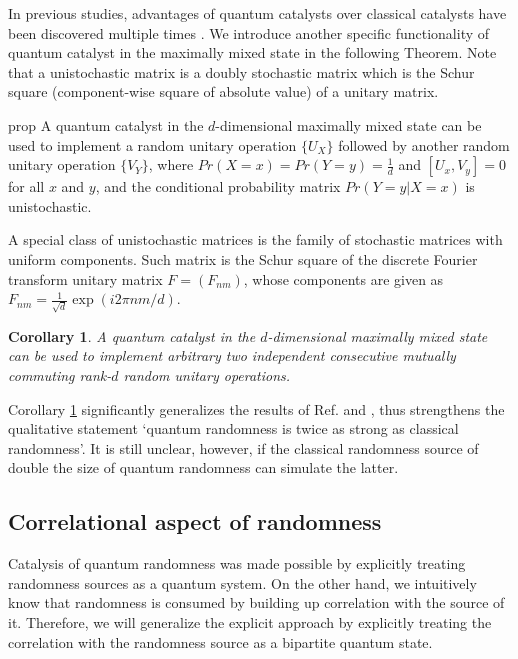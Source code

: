 \documentclass[aps, reprint, amsmath,amssymb, prx, superscriptaddress]{revtex4-2}
\newtheorem{corollary}[theorem]{Corollary}
\begin{document}
In previous studies, advantages of quantum catalysts over classical catalysts have been discovered multiple times \cite{boes2018catalytic, lie2019unconditionally, lie2020uniform}. We introduce another specific functionality of quantum catalyst in the maximally mixed state in the following Theorem. Note that a unistochastic matrix is a doubly stochastic matrix which is the Schur square (component-wise square of absolute value) of a unitary matrix.

\begin{theoremEnd}{prop}
    A quantum catalyst in the $d$-dimensional maximally mixed state can be used to implement a random unitary operation $\{U_X\}$ followed by another random unitary operation $\{V_Y\}$, where $Pr(X=x)=Pr(Y=y)=\frac{1}{d}$ and $[U_x,V_y]=0$ for all $x$ and $y$, and the conditional probability matrix $Pr(Y=y|X=x)$ is unistochastic.
\end{theoremEnd}

A special class of unistochastic matrices is the family of stochastic matrices with uniform components. Such matrix is the Schur square of the discrete Fourier transform unitary matrix $F=(F_{nm})$, whose components are given as $F_{nm}=\frac{1}{\sqrt{d}}\exp(i2\pi nm/d)$.


\begin{corollary} \label{coro:double}
    A quantum catalyst in the $d$-dimensional maximally mixed state can be used to implement arbitrary two independent consecutive mutually commuting rank-$d$ random unitary operations.
\end{corollary}

Corollary \ref{coro:double} significantly generalizes the results of Ref. \cite{boes2018catalytic} and \cite{lie2020randomness, lie2020uniform}, thus strengthens the qualitative statement `quantum randomness is twice as strong as classical randomness'. It is still unclear, however, if the classical randomness source of double the size of quantum randomness can simulate the latter.

\subsection{Correlational aspect of randomness}\label{subsec:corasp}

 Catalysis of quantum randomness \cite{boes2018catalytic, lie2019unconditionally, lie2020randomness} was made possible by explicitly treating randomness sources as a quantum system. On the other hand, we intuitively know that randomness is consumed by building up correlation with the source of it. Therefore, we will generalize the explicit approach by explicitly treating the correlation with the randomness source as a bipartite quantum state.
 
\end{document}
